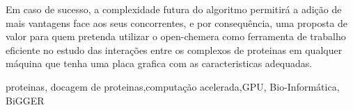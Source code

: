 Em caso de sucesso, a complexidade futura do algoritmo permitirá a adição de mais vantagens face aos seus concorrentes, e por consequência, uma proposta de valor para quem pretenda utilizar o open-chemera como ferramenta de trabalho eficiente no estudo das interações entre os complexos de proteinas em qualquer máquina que tenha uma placa grafica com as caracteristicas adequadas.
%
%
%


\begin{keywords}
proteinas, docagem de proteinas,computação acelerada,GPU, Bio-Informática, BiGGER
\end{keywords}
